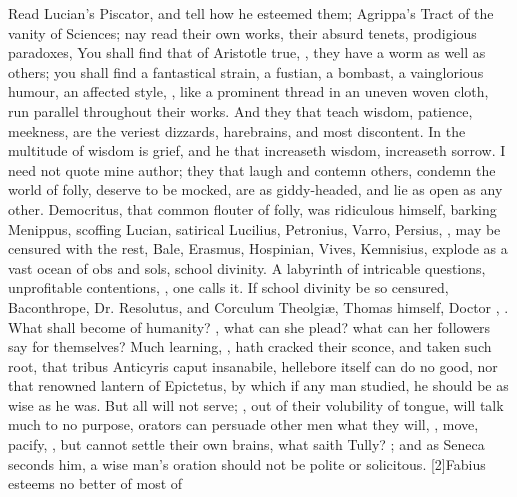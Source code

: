 {Read Lucian's Piscator, and tell how he esteemed them; Agrippa's Tract
of the vanity of Sciences; nay read their own works, their absurd
tenets, prodigious paradoxes,  You shall find
that of Aristotle true, ,
they have a worm as well as others; you shall find a fantastical
strain, a fustian, a bombast, a vainglorious humour, an affected style,
\etc{}, like a prominent thread in an uneven woven cloth, run parallel
throughout their works. And they that teach wisdom, patience, meekness,
are the veriest dizzards, harebrains, and most discontent. In the
multitude of wisdom is grief, and he that increaseth wisdom, increaseth
sorrow. I need not quote mine author; they that laugh and contemn
others, condemn the world of folly, deserve to be mocked, are as
giddy-headed, and lie as open as any other. Democritus, that
common flouter of folly, was ridiculous himself, barking Menippus,
scoffing Lucian, satirical Lucilius, Petronius, Varro, Persius, \etc{},
may be censured with the rest,  Bale, Erasmus, Hospinian, Vives, Kemnisius, explode as a vast
ocean of obs and sols, school divinity. A labyrinth of intricable
questions, unprofitable contentions, , one
calls it. If school divinity be so censured,  Baconthrope, Dr. Resolutus, and Corculum Theolgi\ae{},
Thomas himself, Doctor , \etc{}. What
shall become of humanity? , what can she plead? what can her
followers say for themselves? Much learning,  ,
hath cracked their sconce, and taken such root, that tribus Anticyris
caput insanabile, hellebore itself can do no good, nor that renowned
lantern of Epictetus, by which if any man studied, he should be as
wise as he was. But all will not serve; , out of their volubility of tongue, will
talk much to no purpose, orators can persuade other men what they will,
, move, pacify, \etc{}, but cannot settle their own
brains, what saith Tully? ; and as Seneca seconds him, a wise man's oration should
not be polite or solicitous. [2\baselineskip]Fabius esteems no better of most of
}

